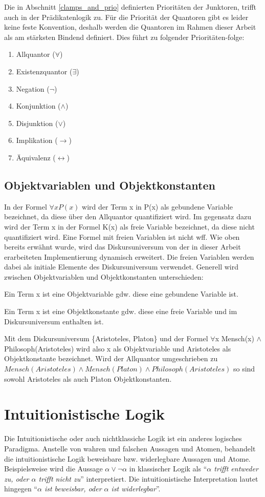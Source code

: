 Die in Abschnitt \ref{clamps_and_prio} definierten Prioritäten der Junktoren, trifft auch in der Prädikatenlogik zu. Für die Priorität der Quantoren gibt es leider keine feste Konvention, deshalb werden die Quantoren im Rahmen dieser Arbeit als am stärksten Bindend definiert. Dies führt zu folgender Prioritäten-folge:
\begin{enumerate}
\item Allquantor ($\forall$)
\item Existenzquantor ($\exists$)
\item Negation ($\neg$)
\item Konjunktion ($\wedge$)
\item Disjunktion ($\vee$)
\item Implikation ($\rightarrow$)
\item Äquivalenz ($\leftrightarrow$)
\end{enumerate}

\subsection{\label{sec:objvar_objconst}Objektvariablen und Objektkonstanten}
In der Formel $\forall x P(x)$ wird der Term x in P(x) als gebundene Variable bezeichnet, da diese über den Allquantor quantifiziert wird. Im gegensatz dazu wird der Term x in der Formel K(x) als freie Variable bezeichnet, da diese nicht quantifiziert wird. Eine Formel mit freien Variablen ist nicht \ac{wff}. Wie oben bereits erwähnt wurde, wird das Diskursuniversum von der in dieser Arbeit erarbeiteten Implementierung dynamisch erweitert. Die freien Variablen werden dabei als initiale Elemente des Diskursuniversum verwendet. Generell wird zwischen Objektvariablen und Objektkonstanten unterschieden:

Ein Term x ist eine Objektvariable gdw. diese eine gebundene Variable ist.

Ein Term x ist eine Objektkonstante gdw. diese eine freie Variable und im Diskursuniversum enthalten ist.

Mit dem Diskursuniversum \{Aristoteles, Platon\} und der Formel $\forall$x Mensch(x) $\wedge$ Philosoph(Aristoteles) wird also x als Objektvariable und Aristoteles als Objektkonstante bezeichnet. Wird der Allquantor umgeschrieben zu $Mensch(Aristoteles) \wedge Mensch(Platon) \wedge Philosoph(Aristoteles)$ so sind sowohl Aristoteles als auch Platon Objektkonstanten.

\section{Intuitionistische Logik}
Die Intuitionistische oder auch nichtklassiche Logik ist ein anderes logisches Paradigma. Anstelle von wahren und falschen Aussagen und Atomen, behandelt die intuitionistische Logik beweisbare bzw. widerlegbare Aussagen und Atome. Beispielsweise wird die Aussage $\alpha\vee\neg\alpha$ in klassischer Logik als ``\textit{$\alpha$ trifft entweder zu, oder $\alpha$ trifft nicht zu}'' interpretiert. Die intuitionistische Interpretation lautet hingegen ``\textit{$\alpha$ ist beweisbar, oder $\alpha$ ist widerlegbar}''.

